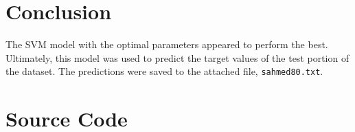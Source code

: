 \documentclass[11pt]{article}
\begin{document}
\section{Conclusion}
The SVM model with the optimal parameters appeared to perform the best. Ultimately, this model was used to predict the target values of the test portion of the dataset. The predictions were saved to the attached file, \texttt{sahmed80.txt}.




\appendix
{}%

\section{Source Code} \label{appendix:src}


\end{document}
